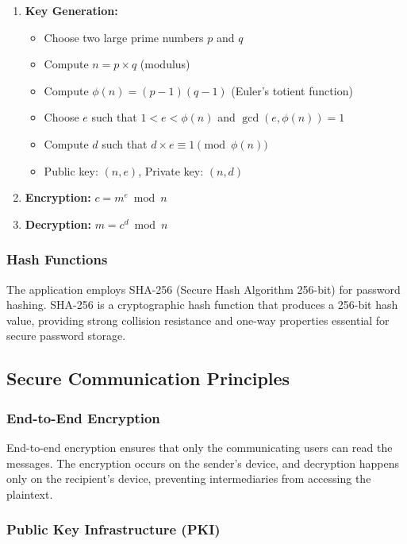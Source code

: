 \documentclass[12pt,a4paper]{article}
\begin{document}
\begin{enumerate}
    \item \textbf{Key Generation:}
    \begin{itemize}
        \item Choose two large prime numbers $p$ and $q$
        \item Compute $n = p \times q$ (modulus)
        \item Compute $\phi(n) = (p-1)(q-1)$ (Euler's totient function)
        \item Choose $e$ such that $1 < e < \phi(n)$ and $\gcd(e, \phi(n)) = 1$
        \item Compute $d$ such that $d \times e \equiv 1 \pmod{\phi(n)}$
        \item Public key: $(n, e)$, Private key: $(n, d)$
    \end{itemize}

    \item \textbf{Encryption:} $c = m^e \bmod n$
    \item \textbf{Decryption:} $m = c^d \bmod n$
\end{enumerate}

\subsubsection{Hash Functions}

The application employs SHA-256 (Secure Hash Algorithm 256-bit) for password hashing. SHA-256 is a cryptographic hash function that produces a 256-bit hash value, providing strong collision resistance and one-way properties essential for secure password storage.

\subsection{Secure Communication Principles}

\subsubsection{End-to-End Encryption}

End-to-end encryption ensures that only the communicating users can read the messages. The encryption occurs on the sender's device, and decryption happens only on the recipient's device, preventing intermediaries from accessing the plaintext.

\subsubsection{Public Key Infrastructure (PKI)}
\end{document}
